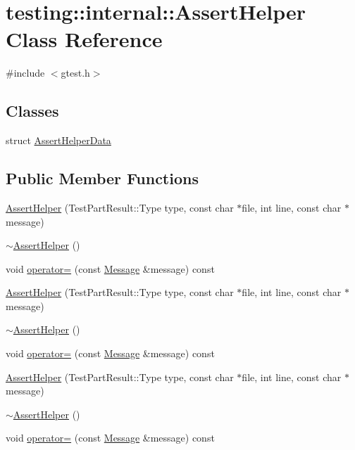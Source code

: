 \hypertarget{classtesting_1_1internal_1_1_assert_helper}{}\section{testing\+::internal\+::Assert\+Helper Class Reference}
\label{classtesting_1_1internal_1_1_assert_helper}


{\ttfamily \#include $<$gtest.\+h$>$}

\subsection*{Classes}
\begin{DoxyCompactItemize}
\item 
struct \mbox{\hyperlink{structtesting_1_1internal_1_1_assert_helper_1_1_assert_helper_data}{Assert\+Helper\+Data}}
\end{DoxyCompactItemize}
\subsection*{Public Member Functions}
\begin{DoxyCompactItemize}
\item 
\mbox{\hyperlink{classtesting_1_1internal_1_1_assert_helper_ac2c9334518fd4087189b4505567a3c90}{Assert\+Helper}} (Test\+Part\+Result\+::\+Type type, const char $\ast$file, int line, const char $\ast$message)
\item 
\mbox{\hyperlink{classtesting_1_1internal_1_1_assert_helper_a51c640785d4ed4a0155cc9aa857d8931}{$\sim$\+Assert\+Helper}} ()
\item 
void \mbox{\hyperlink{classtesting_1_1internal_1_1_assert_helper_a97bf22d786131ab7baa86b97a27aeb4d}{operator=}} (const \mbox{\hyperlink{classtesting_1_1_message}{Message}} \&message) const
\item 
\mbox{\hyperlink{classtesting_1_1internal_1_1_assert_helper_ac2c9334518fd4087189b4505567a3c90}{Assert\+Helper}} (Test\+Part\+Result\+::\+Type type, const char $\ast$file, int line, const char $\ast$message)
\item 
\mbox{\hyperlink{classtesting_1_1internal_1_1_assert_helper_a51c640785d4ed4a0155cc9aa857d8931}{$\sim$\+Assert\+Helper}} ()
\item 
void \mbox{\hyperlink{classtesting_1_1internal_1_1_assert_helper_a97bf22d786131ab7baa86b97a27aeb4d}{operator=}} (const \mbox{\hyperlink{classtesting_1_1_message}{Message}} \&message) const
\item 
\mbox{\hyperlink{classtesting_1_1internal_1_1_assert_helper_ac2c9334518fd4087189b4505567a3c90}{Assert\+Helper}} (Test\+Part\+Result\+::\+Type type, const char $\ast$file, int line, const char $\ast$message)
\item 
\mbox{\hyperlink{classtesting_1_1internal_1_1_assert_helper_a51c640785d4ed4a0155cc9aa857d8931}{$\sim$\+Assert\+Helper}} ()
\item 
void \mbox{\hyperlink{classtesting_1_1internal_1_1_assert_helper_a97bf22d786131ab7baa86b97a27aeb4d}{operator=}} (const \mbox{\hyperlink{classtesting_1_1_message}{Message}} \&message) const
\end{DoxyCompactItemize}

